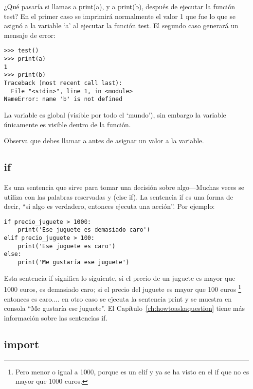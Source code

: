\begin{listing}
¿Qué pasaría si llamas a print(a), y a print(b), después de ejecutar la función test?  En el primer caso se imprimirá normalmente el valor 1 que fue lo que se asignó a la variable `a' al ejecutar la función test. El segundo caso generará un mensaje de error:

\begin{listing}
\begin{verbatim}
>>> test()
>>> print(a)
1
>>> print(b)
Traceback (most recent call last):
  File "<stdin>", line 1, in <module>
NameError: name 'b' is not defined
\end{verbatim}
\end{listing}

La variable  es global (visible por todo el `mundo'), sin embargo la variable  únicamente es visible dentro de la función.  

Observa que debes llamar a  antes de asignar un valor a la variable.

\subsection*{if}

Es una sentencia que sirve para tomar una decisión sobre algo---Muchas veces se utiliza con las palabras reservadas  y  (else if).  La sentencia if es una forma de decir, ``si algo es verdadero, entonces ejecuta una acción''.  Por ejemplo:

\begin{listing}
\begin{verbatim}
if precio_juguete > 1000:
    print('Ese juguete es demasiado caro')
elif precio_juguete > 100:
    print('Ese juguete es caro')
else:
    print('Me gustaría ese juguete')
\end{verbatim}
\end{listing}

Esta sentencia if significa lo siguiente, si el precio de un juguete es mayor que 1000 euros, es demasiado caro; si el precio del juguete es mayor que 100 euros \footnote{Pero menor o igual a 1000, porque es un elif y ya se ha visto en el if que no es mayor que 1000 euros.} entonces es caro.... en otro caso se ejecuta la sentencia print y se muestra en consola ``Me gustaría ese juguete''. El Capítulo~\ref{ch:howtoaskaquestion} tiene más información sobre las sentencias if.

\subsection*{import}


\end{listing}
